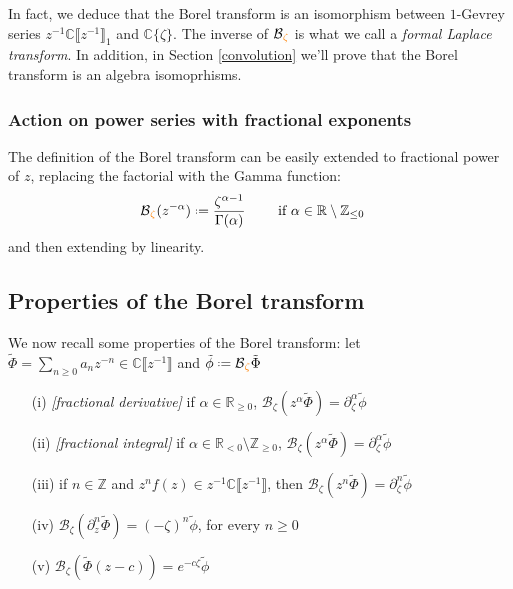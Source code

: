\documentclass{article}
\theoremstyle{definition}
\newcommand{\Z}{\mathbb{Z}}
\newcommand{\R}{\mathbb{R}}
\newcommand{\C}{\mathbb{C}}
\newcommand*{\defeq}{\mathrel{\vcenter{\baselineskip0.5ex \lineskiplimit0pt
                     \hbox{\scriptsize.}\hbox{\scriptsize.}}}%
                     =}
\newcommand{\borel}{\mathcal{B}}
\begin{document}
In fact, we deduce that the Borel transform is an isomorphism between $1$-Gevrey series $z^{-1}\C\llbracket z^{-1}\rrbracket_1$ and $\C\lbrace\zeta\rbrace$. The inverse of $\borel\textcolor{orange}{_\zeta}$ is what we call a \textit{formal Laplace transform}. In addition, in Section \ref{convolution} we’ll prove that the Borel transform is an algebra isomoprhisms. 


\subsubsection{Action on power series with fractional exponents}
The definition of the Borel transform can be easily extended to fractional power of $z$, replacing the factorial with the Gamma function: 
\begin{align*}
\borel\textcolor{orange}{_\zeta}(z^{-\alpha})\defeq \frac{\zeta^{\alpha-1}}{\Gamma(\alpha)} & \qquad \text{ if } \alpha\in\R\setminus\Z_{\leq 0}
\end{align*}
and then extending by linearity.

\subsection{Properties of the Borel transform}\label{properties Borel transform}
We now recall some properties of the Borel transform: let $\tilde{\Phi}=\sum_{n\geq 0}a_nz^{-n}\in\C\llbracket z^{-1}\rrbracket$ and $\tilde{\phi}\defeq\borel\textcolor{orange}{_\zeta}\tilde{\Phi}$
\begin{itemize}
\item[(i)] \emph{[fractional derivative]} if $\alpha\in\R_{\geq 0}$, $\borel_\zeta\left(z^\alpha \tilde{\Phi}\right)=\partial_{\zeta}^{\alpha}\tilde{\phi}$
\item[(ii)] \emph{[fractional integral]} if $\alpha\in\R_{<0}\setminus\Z_{\geq 0}$, $\borel_\zeta\left(z^\alpha \tilde{\Phi}\right)=\partial_{\zeta}^{\alpha}\tilde{\phi}$
\item[(iii)] if $n\in\Z$ and $z^nf(z)\in z^{-1}\C \llbracket z^{-1} \rrbracket$, then $\borel_\zeta (z^n\tilde{\Phi})=\partial_\zeta^n\tilde{\phi}$ 
\item[(iv)] $\borel_\zeta\left(\partial_z^{n} \tilde{\Phi}\right)=(-\zeta)^n\tilde{\phi}$, for every $n\geq 0$
\item[(v)] $\borel_{\zeta}(\tilde{\Phi}(z-c))=e^{-c\zeta}\tilde{\phi}$
\end{itemize} 
\end{document}

